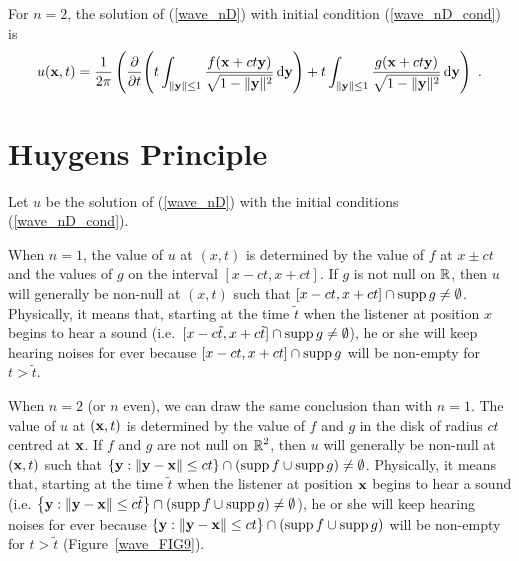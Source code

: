 
For $n=2$, the solution of (\ref{wave_nD}) with initial condition
(\ref{wave_nD_cond}) is
\[
u(\VEC{x},t) = \frac{1}{2\pi}
\left( \pdfdx{\left( t \int_{\|\VEC{y}\|\leq 1}
\frac{f(\VEC{x} + ct \VEC{y})}{\sqrt{1-\|\VEC{y}\|^2}} \dx{\VEC{y}} \right)}{t}
+ t \int_{\|\VEC{y}\|\leq 1}
\frac{g(\VEC{x}+ ct\VEC{y})}{\sqrt{1-\|\VEC{y}\|^2}} \dx{\VEC{y}}
\right) \ .
\]

\section{Huygens Principle}

Let $u$ be the solution of (\ref{wave_nD}) with the initial
conditions (\ref{wave_nD_cond}).

When $n=1$, the value of $u$ at $(x,t)$ is determined by the value of $f$
at $x\pm ct$ and the values of $g$ on the interval $[x-ct, x+ct]$.  If
$g$ is not null on $\RR$, then $u$ will generally be non-null at
$(x,t)$ such that $[x-ct, x+ct] \cap \supp g \neq \emptyset$.
Physically, it means that, starting at the time $\tilde{t}$ when the
listener at position $x$ begins to hear a sound
(i.e.\ $[x-c\tilde{t}, x+c\tilde{t}] \cap \supp g \neq \emptyset$),
he or she will keep hearing noises for ever
because $[x-ct, x+ct] \cap \supp g$ will be non-empty for $t>\tilde{t}$.

When $n=2$ (or $n$ even), we can draw the same conclusion than with
$n=1$.  The value of $u$ at $(\VEC{x},t)$ is determined by the value
of $f$ and $g$ in the disk of radius $ct$ centred at $\VEC{x}$.  If
$f$ and $g$ are not null on $\displaystyle \RR^2$, then $u$ will
generally be non-null at $(\VEC{x},t)$ such that
$\left\{ \VEC{y} : \|\VEC{y}-\VEC{x}\| \leq ct\right\}
\cap (\supp f \cup \supp g) \neq \emptyset$.
Physically, it means that, starting at the time $\tilde{t}$ when the
listener at position $\VEC{x}$ begins to hear a sound
(i.e. $\left\{ \VEC{y} : \|\VEC{y}-\VEC{x}\| \leq c\tilde{t}\right\}
\cap (\supp f \cup \supp g) \neq \emptyset$), he or she will keep
hearing noises for ever 
because $\left\{ \VEC{y} : \|\VEC{y}-\VEC{x}\| \leq ct\right\}
\cap (\supp f \cup \supp g)$
will be non-empty for $t>\tilde{t}$ (Figure~\ref{wave_FIG9}).

